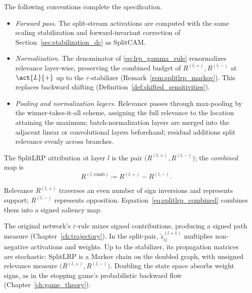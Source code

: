The following conventions complete the specification.
\begin{itemize}
	\item \emph{Forward pass.} The split-stream activations are computed with the same scaling stabilization and forward-invariant correction of Section~\ref{sec:stabilization_dc} as SplitCAM.
	\item \emph{Normalization.} The denominator of \eqref{eq:lrp_gamma_rule} renormalizes relevance layer-wise, preserving the combined budget of $R^{(l,+)},R^{(l,-)}$ at $\act{L}{+}$ up to the $\varepsilon$-stabilizer (Remark~\ref{rem:splitlrp_markov}). This replaces backward shifting (Definition~\ref{def:shifted_sensitivities}).
	\item \emph{Pooling and normalization layers.} Relevance passes through max-pooling by the winner-takes-it-all scheme, assigning the full relevance to the location attaining the maximum; batch-nor\-mal\-iza\-tion layers are merged into the adjacent linear or convolutional layers beforehand; residual additions split relevance evenly across branches.
\end{itemize}

\begin{definition}\label{def:splitlrp_combined}
The SplitLRP attribution at layer $l$ is the pair $\bigl(R^{(l,+)}, R^{(l,-)}\bigr)$; the \emph{combined} map is
\begin{equation}
	R^{(l, \mathrm{comb})} \coloneqq R^{(l, +)} - R^{(l, -)}.
	\label{eq:splitlrp_combined}
\end{equation}
\end{definition}

Relevance $R^{(l,+)}$ traverses an even number of sign inversions and represents support; $R^{(l,-)}$ represents opposition. Equation~\eqref{eq:splitlrp_combined} combines them into a signed saliency map.

\begin{remark}\label{rem:splitlrp_markov}
The original network's $\varepsilon$-rule mixes signed contributions, producing a signed path measure (Chapter~\ref{ch:trajectory}). In the split-pair, $\tilde{z}^{(l+1)}_{ij}$ multiplies non-negative activations and weights. Up to the stabilizer, its propagation matrices are stochastic: SplitLRP is a Markov chain on the doubled graph, with unsigned relevance measure $\bigl(R^{(l,+)},R^{(l,-)}\bigr)$. Doubling the state space absorbs weight signs, as in the stopping game's probabilistic backward flow (Chapter~\ref{ch:game_theory}).
\end{remark}

